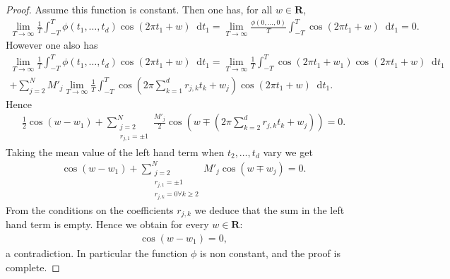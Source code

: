\documentclass[a4paper,10pt]{amsart}
\theoremstyle{plain}
\theoremstyle{definition}
\begin{document}
\begin{proof}
Assume this function is constant.
Then one has, for all $w \in\mathbf{R}$,
\begin{align*}
\lim_{T\rightarrow\infty}\frac{1}{T}\int_{-T}^{T} \phi(t_{1},\ldots,t_{d})\cos(2\pi t_{1} + w){\mathop{}\!\mathrm{d}} t_{1} 
= \lim_{T\rightarrow\infty}\frac{\phi(0,\ldots,0)}{T}\int_{-T}^{T} \cos(2\pi t_{1} + w){\mathop{}\!\mathrm{d}} t_{1}
= 0.
\end{align*}
However one also has
\begin{multline*}
\lim_{T\rightarrow\infty}\frac{1}{T}\int_{-T}^{T} \phi(t_{1},\ldots,t_{d})\cos(2\pi t_{1} + w){\mathop{}\!\mathrm{d}} t_{1} 
= \lim_{T\rightarrow\infty}\frac{1}{T}\int_{-T}^{T} \cos(2\pi t_{1} + w_{1})\cos(2\pi t_{1} + w) {\mathop{}\!\mathrm{d}} t_{1} \\
+ \sum_{j=2}^{N}M'_{j}\lim_{T\rightarrow\infty}\frac{1}{T}\int_{-T}^{T} \cos(2\pi\sum_{k=1}^{d}r_{j,k}t_{k} + w_{j}) \cos(2\pi t_{1} + w){\mathop{}\!\mathrm{d}} t_{1}.
\end{multline*}
Hence
\begin{align*}
\frac{1}{2}\cos(w - w_{1}) + \sum_{\substack{j=2 \\ r_{j,1} = \pm 1}}^{N}\frac{M'_{j}}{2}\cos\left(w \mp \left(2\pi\sum_{k=2}^{d}r_{j,k}t_{k} + w_{j}\right)\right) = 0.
\end{align*}
Taking the mean value of the left hand term when $t_{2},\ldots,t_{d}$ vary we get
\begin{align*}
\cos(w - w_{1}) + \sum_{\substack{j=2 \\ r_{j,1} = \pm 1 \\ r_{j,k} = 0 \forall k \geq 2}}^{N}M'_{j}\cos\left(w \mp  w_{j}\right) = 0.
\end{align*}
From the conditions on the coefficients $r_{j,k}$ we deduce that the sum in the left hand term is empty.
Hence we obtain for every $w\in\mathbf{R}$:
\begin{align*}
\cos(w - w_{1}) = 0,
\end{align*}
a contradiction. In particular the function $\phi$ is non constant, and the proof is complete.
\end{proof}
\end{document}
